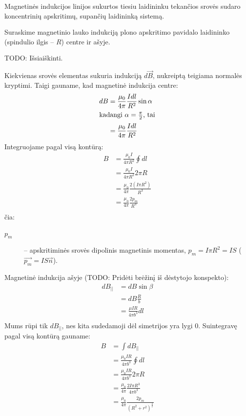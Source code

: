 Magnetinės indukcijos linijos sukurtos tiesiu laidininku tekančios
srovės sudaro koncentrinių apskritimų, supančių laidininką sistemą.

\begin{exmp}
  Suraskime magnetinio lauko indukciją plono apskritimo pavidalo
  laidininko (spindulio ilgis – $R$) centre ir ašyje.

  TODO: Išsiaiškinti.

  Kiekvienas srovės elementas sukuria indukciją $d\vec{B}$, nukreiptą
  teigiama normalės kryptimi. Taigi gauname, kad magnetinė indukcija
  centre:
  \begin{align*}
    d B
    &= \frac{\mu_{0}}{4\pi} \frac{I dl}{R^{2}} \sin \alpha \\
    \intertext{kadangi $\alpha = \frac{\pi}{2}$, tai}
    &= \frac{\mu_{0}}{4\pi} \frac{I dl}{R^{2}} \\
  \end{align*}
  Integruojame pagal visą kontūrą:
  \begin{align*}
    B
    &= \frac{\mu_{0}I}{4 \pi R^{2}} \oint dl \\
    &= \frac{\mu_{0}I}{4 \pi R^{2}} 2 \pi R \\
    &= \frac{\mu_{0}}{4 \pi} \frac{2 \left( I \pi R^{2} \right)}{R^{3}} \\
    &= \frac{\mu_{0}}{4 \pi} \frac{2 p_{m}}{R^{3}} \\
  \end{align*}
  čia:
  \begin{description}
    \item[$p_{m}$] – apskritiminės srovės dipolinis magnetinis momentas,
      $p_{m} = I \pi R^{2} = IS$ ($\vec{p_{m}} = I S \vec{n}$).
  \end{description}

  Magnetinė indukcija ašyje (TODO: Pridėti brėžinį iš dėstytojo konspekto):
  \begin{align*}
    d B_{||}
    &= d B \sin \beta \\
    &= d B \frac{R}{b} \\
    &= \frac{\mu I R}{4 \pi b^{3}} dl \\
  \end{align*}
  Mums rūpi tik $d B_{||}$, nes kita sudedamoji dėl simetrijos yra
  lygi 0. Suintegravę pagal visą kontūrą gauname:
  \begin{align*}
    B
    &= \int d B_{||} \\
    &= \frac{\mu_{0} I R}{4 \pi b^{3}} \oint dl \\
    &= \frac{\mu_{0} I R}{4 \pi b^{3}} 2 \pi R \\
    &= \frac{\mu_{0}}{4 \pi} \frac{2 I \pi R^{3}}{4 \pi b^{3}} \\
    &= \frac{\mu_{0}}{4\pi}
      \frac{2 p_{m}}{\left( R^{2} + r^{2} \right)^{\frac{3}{2}}}
  \end{align*}
\end{exmp}

